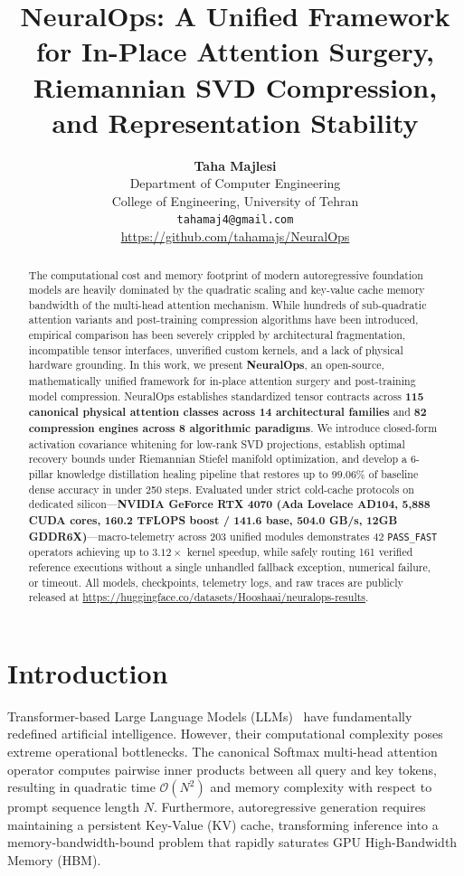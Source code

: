 \documentclass{article}
\title{NeuralOps: A Unified Framework for In-Place Attention Surgery, Riemannian SVD Compression, and Representation Stability}
\author{
  \textbf{Taha Majlesi} \\
  Department of Computer Engineering \\
  College of Engineering, University of Tehran \\
  \texttt{tahamaj4@gmail.com} \\
  \url{https://github.com/tahamajs/NeuralOps}
}
\newcommand{\passfast}{\texttt{PASS\_FAST}}
\begin{document}
\maketitle

\begin{abstract}
The computational cost and memory footprint of modern autoregressive foundation models are heavily dominated by the quadratic scaling and key-value cache memory bandwidth of the multi-head attention mechanism. While hundreds of sub-quadratic attention variants and post-training compression algorithms have been introduced, empirical comparison has been severely crippled by architectural fragmentation, incompatible tensor interfaces, unverified custom kernels, and a lack of physical hardware grounding. In this work, we present \textbf{NeuralOps}, an open-source, mathematically unified framework for in-place attention surgery and post-training model compression. NeuralOps establishes standardized tensor contracts across \textbf{115 canonical physical attention classes across 14 architectural families} and \textbf{82 compression engines across 8 algorithmic paradigms}. We introduce closed-form activation covariance whitening for low-rank SVD projections, establish optimal recovery bounds under Riemannian Stiefel manifold optimization, and develop a 6-pillar knowledge distillation healing pipeline that restores up to $99.06\%$ of baseline dense accuracy in under 250 steps. Evaluated under strict cold-cache protocols on dedicated silicon---\textbf{NVIDIA GeForce RTX 4070 (Ada Lovelace AD104, 5,888 CUDA cores, 160.2 TFLOPS boost / 141.6 base, 504.0 GB/s, 12GB GDDR6X)}---macro-telemetry across 203 unified modules demonstrates 42 \passfast{} operators achieving up to $3.12\times$ kernel speedup, while safely routing 161 verified reference executions without a single unhandled fallback exception, numerical failure, or timeout. All models, checkpoints, telemetry logs, and raw traces are publicly released at \url{https://huggingface.co/datasets/Hooshaai/neuralops-results}.
\end{abstract}

\section{Introduction}
\label{sec:introduction}
Transformer-based Large Language Models (LLMs)~\citep{vaswani2017attention} have fundamentally redefined artificial intelligence. However, their computational complexity poses extreme operational bottlenecks. The canonical Softmax multi-head attention operator computes pairwise inner products between all query and key tokens, resulting in quadratic time $\mathcal{O}(N^2)$ and memory complexity with respect to prompt sequence length $N$. Furthermore, autoregressive generation requires maintaining a persistent Key-Value (KV) cache, transforming inference into a memory-bandwidth-bound problem that rapidly saturates GPU High-Bandwidth Memory (HBM).
\end{document}
